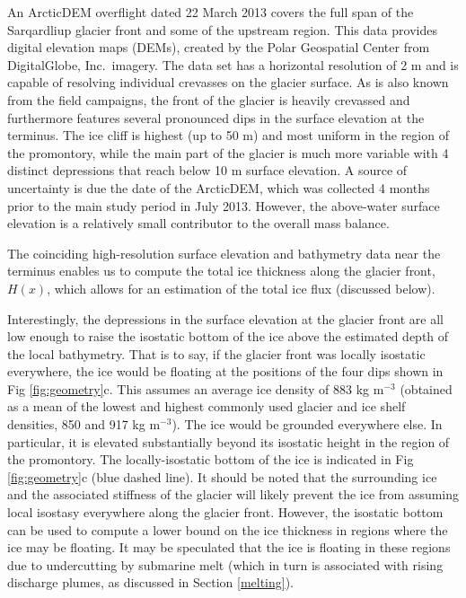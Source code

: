 \documentclass[30pt,letterpaper]{article}
\begin{document}
An ArcticDEM overflight dated 22 March 2013 covers the full span of the Sarqardliup glacier front and some of the upstream region. This data provides digital elevation maps (DEMs), created by the Polar Geospatial Center from DigitalGlobe, Inc.~imagery. The data set has a horizontal resolution of 2 m and is capable of resolving individual crevasses on the glacier surface. As is also known from the field campaigns, the front of the glacier is heavily crevassed and furthermore features several pronounced dips in the surface elevation at the terminus. The ice cliff is highest (up to 50 m) and most uniform in the region of the promontory, while the main part of the glacier is much more variable with 4 distinct depressions that reach below 10 m surface elevation. A source of uncertainty is due the date of the ArcticDEM, which was collected 4 months prior to the main study period in July 2013. However, the above-water surface elevation is a relatively small contributor to the overall mass balance.

The coinciding high-resolution surface elevation and bathymetry data near the terminus enables us to compute the total ice thickness along the glacier front, $H(x)$, which allows for an estimation of the total ice flux (discussed below). 

Interestingly, the depressions in the surface elevation at the glacier front are all low enough to raise the isostatic bottom of the ice above the estimated depth of the local bathymetry. That is to say, if the glacier front was locally isostatic everywhere, the ice would be floating at the positions of the four dips shown in Fig \ref{fig:geometry}c. This assumes an average ice density of 883 kg m$^{-3}$ (obtained as a mean of the lowest and highest commonly used glacier and ice shelf densities, 850 and 917 kg m$^{-3}$). The ice would be grounded everywhere else. In particular, it is elevated substantially beyond its isostatic height in the region of the promontory. The locally-isostatic bottom of the ice is indicated in Fig \ref{fig:geometry}c (blue dashed line). It should be noted that the surrounding ice and the associated stiffness of the glacier will likely prevent the ice from assuming local isostasy everywhere along the glacier front. However, the isostatic bottom can be used to compute a lower bound on the ice thickness in regions where the ice may be floating. It may be speculated that the ice is floating in these regions due to undercutting by submarine melt (which in turn is associated with rising discharge plumes, as discussed in Section \ref{melting}). 
\end{document}
